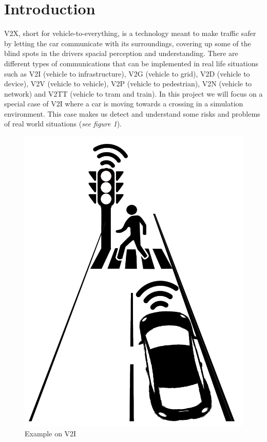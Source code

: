 \newpage
\section{Introduction}
V2X, short for vehicle-to-everything, is a technology meant to make traffic safer by letting the car communicate with its surroundings, covering up some of the blind spots in the drivers spacial perception and understanding. There are different types of communications that can be implemented in real life situations such as V2I (vehicle to infrastructure), V2G (vehicle to grid), V2D (vehicle to device), V2V (vehicle to vehicle), V2P (vehicle to pedestrian), V2N (vehicle to network) and V2TT (vehicle to tram and train). In this project we will focus on a special case of V2I where a car is moving towards a crossing in a simulation environment. This case makes us detect and understand some risks and problems of real world situations (\textit{see figure 1}).

\begin{figure}[H]
    \centering
    \includegraphics[scale=0.45]{images/V2I.png}
    \caption{Example on V2I}
\end{figure}

